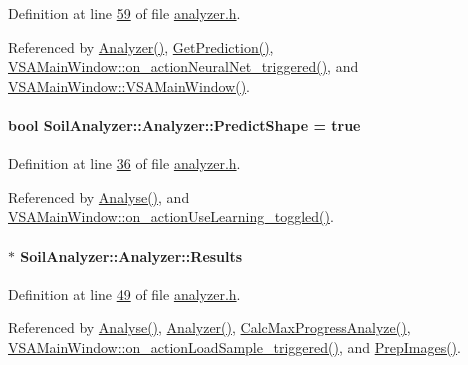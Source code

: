 Definition at line \hyperlink{analyzer_8h_source_l00059}{59} of file \hyperlink{analyzer_8h_source}{analyzer.\+h}.



Referenced by \hyperlink{analyzer_8cpp_source_l00018}{Analyzer()}, \hyperlink{analyzer_8cpp_source_l00373}{Get\+Prediction()}, \hyperlink{vsamainwindow_8cpp_source_l00353}{V\+S\+A\+Main\+Window\+::on\+\_\+action\+Neural\+Net\+\_\+triggered()}, and \hyperlink{vsamainwindow_8cpp_source_l00004}{V\+S\+A\+Main\+Window\+::\+V\+S\+A\+Main\+Window()}.

\hypertarget{class_soil_analyzer_1_1_analyzer_a43c2a39174daac9059e48860936e38f3}{}
\paragraph[{Predict\+Shape}]{\setlength{\rightskip}{0pt plus 5cm}bool Soil\+Analyzer\+::\+Analyzer\+::\+Predict\+Shape = true}\label{class_soil_analyzer_1_1_analyzer_a43c2a39174daac9059e48860936e38f3}


Definition at line \hyperlink{analyzer_8h_source_l00036}{36} of file \hyperlink{analyzer_8h_source}{analyzer.\+h}.



Referenced by \hyperlink{analyzer_8cpp_source_l00065}{Analyse()}, and \hyperlink{vsamainwindow_8cpp_source_l00512}{V\+S\+A\+Main\+Window\+::on\+\_\+action\+Use\+Learning\+\_\+toggled()}.

\hypertarget{class_soil_analyzer_1_1_analyzer_af80f9fa5784aa6518b3cf80de2c430fe}{}
\paragraph[{Results}]{$\ast$ Soil\+Analyzer\+::\+Analyzer\+::\+Results}\label{class_soil_analyzer_1_1_analyzer_af80f9fa5784aa6518b3cf80de2c430fe}


Definition at line \hyperlink{analyzer_8h_source_l00049}{49} of file \hyperlink{analyzer_8h_source}{analyzer.\+h}.



Referenced by \hyperlink{analyzer_8cpp_source_l00054}{Analyse()}, \hyperlink{analyzer_8cpp_source_l00018}{Analyzer()}, \hyperlink{analyzer_8cpp_source_l00136}{Calc\+Max\+Progress\+Analyze()}, \hyperlink{vsamainwindow_8cpp_source_l00475}{V\+S\+A\+Main\+Window\+::on\+\_\+action\+Load\+Sample\+\_\+triggered()}, and \hyperlink{analyzer_8cpp_source_l00033}{Prep\+Images()}.

